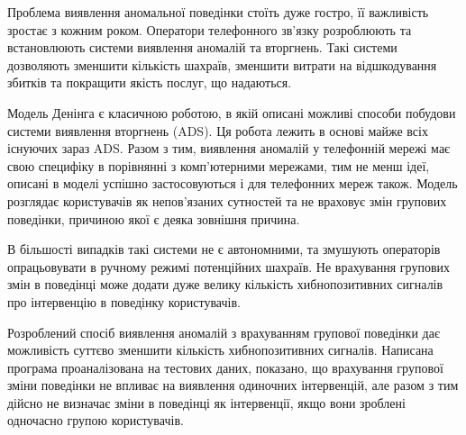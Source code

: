 \newpage
{}

Проблема виявлення аномальної поведінки стоїть дуже гостро, її важливість зростає з кожним роком. Оператори телефонного зв'язку розроблюють та встановлюють системи виявлення аномалій та вторгнень. Такі системи дозволяють зменшити кількість шахраїв, зменшити витрати на відшкодування збитків та покращити якість послуг, що надаються.

Модель Денінга є класичною роботою, в якій описані можливі способи побудови системи виявлення вторгнень (ADS). Ця робота лежить в основі майже всіх існуючих зараз ADS. Разом з тим, виявлення аномалій у телефонній мережі має свою специфіку в порівнянні з комп'ютерними мережами, тим не менш ідеї, описані в моделі успішно застосовуються і для телефонних мереж також. Модель розглядає користувачів як непов'язаних сутностей та не враховує змін групових поведінки, причиною якої є деяка зовнішня причина.

В більшості випадків такі системи не є автономними, та змушують операторів опрацьовувати в ручному режимі потенційних шахраїв. Не врахування групових змін в поведінці може додати дуже велику кількість хибнопозитивних сигналів про інтервенцію в поведінку користувачів.

Розроблений спосіб виявлення аномалій з врахуванням групової поведінки дає можливість суттєво зменшити кількість хибнопозитивних сигналів. Написана програма проаналізована на тестових даних, показано, що врахування групової зміни поведінки не впливає на виявлення одиночних інтервенцій, але разом з тим дійсно не визначає зміни в поведінці як інтервенції, якщо вони зроблені одночасно групою користувачів.
